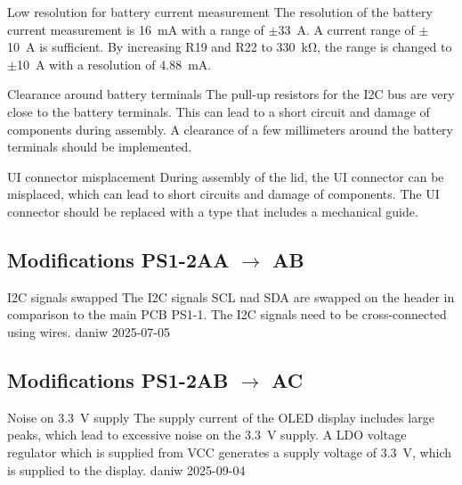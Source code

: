 \begin{ModTable}
\ModItemOpen
{Low resolution for battery current measurement}
{The resolution of the battery current measurement is \qty{16}{\milli\ampere} with a range of $\pm$\qty{33}{\ampere}. A current range of $\pm$\qty{10}{\ampere} is sufficient. }
{By increasing R19 and R22 to \qty{330}{\kilo\ohm}, the range is changed to $\pm$\qty{10}{\ampere} with a resolution of \qty{4.88}{\milli\ampere}. }
{}
{}

\ModItemOpen
{Clearance around battery terminals}
{The pull-up resistors for the I2C bus are very close to the battery terminals. This can lead to a short circuit and damage of components during assembly. }
{A clearance of a few millimeters around the battery terminals should be implemented. }
{}
{}

\ModItemOpen
{\acs{UI} connector misplacement}
{During assembly of the lid, the \ac{UI} connector can be misplaced, which can lead to short circuits and damage of components. }
{The \ac{UI} connector should be replaced with a type that includes a mechanical guide. }
{}
{}

\end{ModTable}

\FloatBarrier

\subsection{Modifications PS1-2AA $\to$ AB}

\begin{ModTable}

\ModItemDone
{\acs{I2C} signals swapped}
{The \ac{I2C} signals SCL nad SDA are swapped on the header in comparison to the main PCB PS1-1. }
{The \ac{I2C} signals need to be cross-connected using wires. }
{daniw}
{2025-07-05}

\end{ModTable}

\FloatBarrier

\subsection{Modifications PS1-2AB $\to$ AC}

\begin{ModTable}

\ModItemDone
{Noise on \qty{3.3}{\volt} supply}
{The supply current of the \ac{OLED} display includes large peaks, which lead to excessive noise on the \qty{3.3}{\volt} supply. }
{A \ac{LDO} voltage regulator which is supplied from VCC generates a supply voltage of \qty{3.3}{\volt}, which is supplied to the display. }
{daniw}
{2025-09-04}

\end{ModTable}

